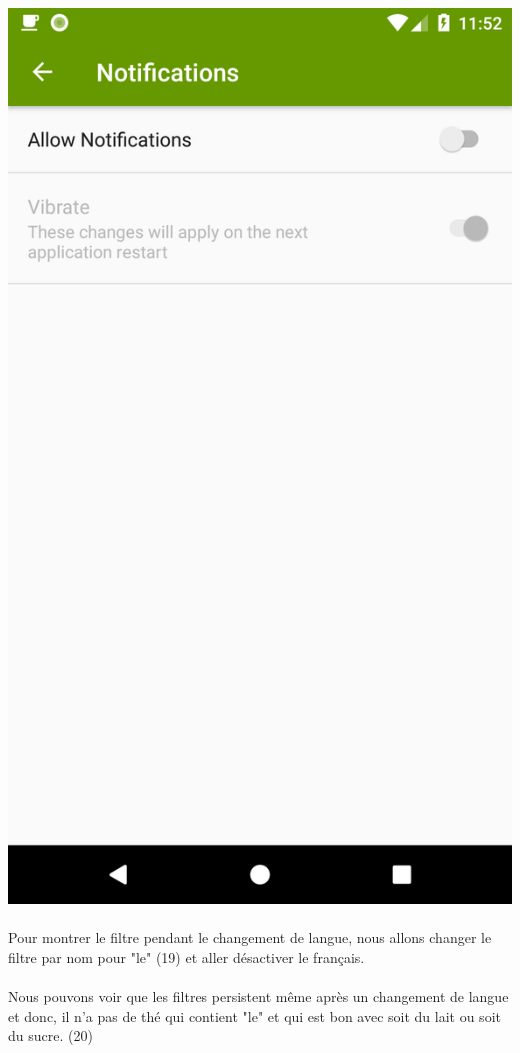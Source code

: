 \documentclass[a4paper,12pt]{article}
\begin{document}
\begin{spacing}{1}
	\includegraphics*[scale=0.1]{Screenshot/21.png}\\\\
	Pour montrer le filtre pendant le changement de langue, nous allons changer le filtre par nom pour "le" (19) et aller désactiver le français. \\\\
	Nous pouvons voir que les filtres persistent même après un changement de langue et donc, il n'a pas de thé qui contient "le" et qui est bon avec soit du lait ou soit du sucre. (20)\\\\

\end{spacing}
\end{document}
